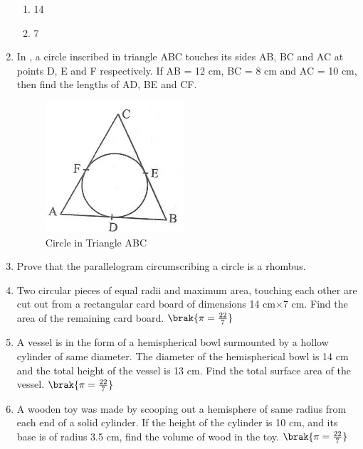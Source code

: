 \begin{enumerate}
\begin{enumerate}
    \item 14\\
    \item 7
 \end{enumerate}
 \item In , a circle inscribed in triangle ABC touches its sides AB, BC and AC at points D, E and F respectively. If AB = 12 cm, BC = 8 cm and AC = 10 cm, then find the lengths of AD, BE and CF.
	\begin{figure}[H]
		\centering
\includegraphics[width=\columnwidth]{figs/4.png}
\caption{Circle in Triangle ABC}
\label{fig:fig4}
\end{figure}
\item Prove that the parallelogram circumscribing a circle is a rhombus.
\item Two circular pieces of equal radii and maximum area, touching each other are cut out from a rectangular card board of dimensions 14 cm$\times$7 cm. Find the area of the remaining card board. $\brak{ \pi = \frac{22}{7}}$
\item A vessel is in the form of a hemispherical bowl surmounted by a hollow cylinder of same diameter. The diameter of the hemispherical bowl is 14 cm and the total height of the vessel is 13 cm. Find the total surface area of the vessel. $\brak{ \pi = \frac{22}{7}}$
\item A wooden toy was made by scooping out a hemisphere of same radius from each end of a solid cylinder. If the height of the cylinder is 10 cm,  and its base is of radius 3.5 cm, find the volume of wood in the toy. $\brak{ \pi = \frac{22}{7}}$

\end{enumerate}
